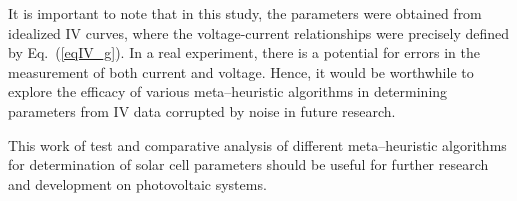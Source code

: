 \documentclass[a4paper,fleqn]{cas-dc}
\begin{document}
It is important to note that in this study,
the parameters were obtained from idealized IV curves,
where the voltage-current relationships were precisely defined by Eq.~(\ref{eqIV_g}).
In a real experiment, there is a potential for errors in the measurement of both current and voltage.
Hence,  it would be worthwhile to explore the efficacy of various meta--heuristic algorithms
in determining parameters from IV data corrupted by noise in future research.

This work of test and comparative analysis of
different meta--heuristic algorithms  for determination
of solar cell parameters should be useful for further research and development on photovoltaic systems.



%


\end{document}
